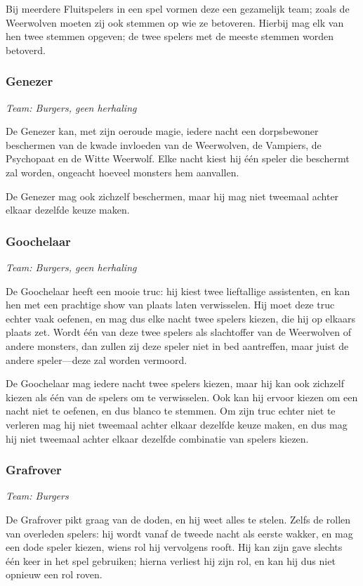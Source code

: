\documentclass[12pt]{article}
\begin{document}
      Bij meerdere Fluitspelers in een spel vormen deze een gezamelijk team; zoals de Weerwolven moeten zij ook stemmen op wie ze betoveren. Hierbij mag elk van hen twee stemmen opgeven; de twee spelers met de meeste stemmen worden betoverd.
    
    \subsubsection{Genezer}
      \emph{\scriptsize Team: Burgers, geen herhaling}
    
      De Genezer kan, met zijn oeroude magie, iedere nacht een dorpsbewoner beschermen van de kwade invloeden van de Weerwolven, de Vampiers, de Psychopaat en de Witte Weerwolf. Elke nacht kiest hij \'e\'en speler die beschermt zal worden, ongeacht hoeveel monsters hem aanvallen. 
    
      De Genezer mag ook zichzelf beschermen, maar hij mag niet tweemaal achter elkaar dezelfde keuze maken.
    
    \subsubsection{Goochelaar}
      \emph{\scriptsize Team: Burgers, geen herhaling}
    
      De Goochelaar heeft een mooie truc: hij kiest twee lieftallige assistenten, en kan hen met een prachtige show van plaats laten verwisselen. Hij moet deze truc echter vaak oefenen, en mag dus elke nacht twee spelers kiezen, die hij op elkaars plaats zet. Wordt \'e\'en van deze twee spelers als slachtoffer van de Weerwolven of andere monsters, dan zullen zij deze speler niet in bed aantreffen, maar juist de andere speler---deze zal worden vermoord.
    
      De Goochelaar mag iedere nacht twee spelers kiezen, maar hij kan ook zichzelf kiezen als \'e\'en van de spelers om te verwisselen. Ook kan hij ervoor kiezen om een nacht niet te oefenen, en dus blanco te stemmen. Om zijn truc echter niet te verleren mag hij niet tweemaal achter elkaar dezelfde keuze maken, en dus mag hij niet tweemaal achter elkaar dezelfde combinatie van spelers kiezen.
    
    \subsubsection{Grafrover}
      \emph{\scriptsize Team: Burgers}
    
      De Grafrover pikt graag van de doden, en hij weet alles te stelen. Zelfs de rollen van overleden spelers: hij wordt vanaf de tweede nacht als eerste wakker, en mag een dode speler kiezen, wiens rol hij vervolgens rooft. Hij kan zijn gave slechts \'e\'en keer in het spel gebruiken; hierna verliest hij zijn rol, en kan hij dus niet opnieuw een rol roven.  
    
\end{document}
